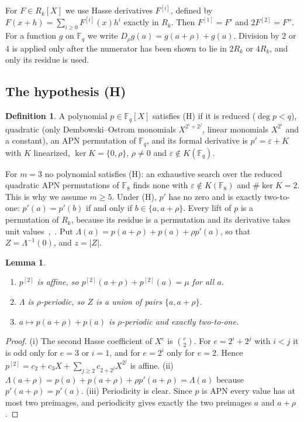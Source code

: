 \documentclass[11pt]{article}
\newtheorem{lemma}[theorem]{Lemma}
\theoremstyle{definition}
\newtheorem{definition}[theorem]{Definition}
\theoremstyle{remark}
\newcommand{\F}{\mathbb{F}}
\begin{document}
For $F\in R_k[X]$ we use Hasse derivatives $F^{[i]}$, defined by $F(x+h)=\sum_{i\ge0}F^{[i]}(x)h^i$ exactly in
$R_k$. Then $F^{[1]}=F'$ and $2F^{[2]}=F''$. For a function $g$ on $\F_q$ we write $D_\rho g(a)=g(a+\rho)+g(a)$.
Division by $2$ or $4$ is applied only after the numerator has been shown to lie in $2R_k$ or $4R_k$, and only
its residue is used.

\subsection{The hypothesis (H)}
\begin{definition}
A polynomial $p\in\F_q[X]$ satisfies (H) if it is reduced ($\deg p<q$), quadratic (only Dembowski--Ostrom
monomials $X^{2^i+2^j}$, linear monomials $X^{2^i}$ and a constant), an APN permutation of $\F_q$, and its
formal derivative is $p'=\varepsilon+K$ with $K$ linearized, $\ker K=\{0,\rho\}$, $\rho\ne0$ and
$\varepsilon\notin K(\F_q)$.
\end{definition}
For $m=3$ no polynomial satisfies (H): an exhaustive search over the reduced quadratic APN permutations of $\F_8$ finds
none with $\varepsilon\notin K(\F_8)$ and $\#\ker K=2$. This is why we assume $m\ge5$. Under (H), $p'$ has no zero and is
exactly two-to-one: $p'(a)=p'(b)$ if and only if $b\in\{a,a+\rho\}$. Every lift
of $p$ is a permutation of $R_k$, because its residue is a permutation and its derivative takes unit
values~\cite[Thm.~2]{RS},~\cite[Thm.~2.1]{BS}. Put $\Lambda(a)=p(a+\rho)+p(a)+\rho p'(a)$, so that
$Z=\Lambda^{-1}(0)$, and $z=|Z|$.

\begin{lemma}\label{lem:F0}
\begin{enumerate}[label=(\roman*)]
\item $p^{[2]}$ is affine, so $p^{[2]}(a+\rho)+p^{[2]}(a)=\mu$ for all $a$.
\item $\Lambda$ is $\rho$-periodic, so $Z$ is a union of pairs $\{a,a+\rho\}$.
\item $a\mapsto p(a+\rho)+p(a)$ is $\rho$-periodic and exactly two-to-one.
\end{enumerate}
\end{lemma}
\begin{proof}
(i) The second Hasse coefficient of $X^e$ is $\binom e2$. For $e=2^i+2^j$ with $i<j$ it is odd only for
$e=3$ or $i=1$, and for $e=2^i$ only for $e=2$. Hence $p^{[2]}=c_2+c_3X+\sum_{j\ge2}c_{2+2^j}X^{2^j}$ is affine.
(ii) $\Lambda(a+\rho)=p(a)+p(a+\rho)+\rho p'(a+\rho)=\Lambda(a)$ because $p'(a+\rho)=p'(a)$.
(iii) Periodicity is clear. Since $p$ is APN every value has at most two preimages, and periodicity gives
exactly the two preimages $a$ and $a+\rho$.
\end{proof}
\end{document}
